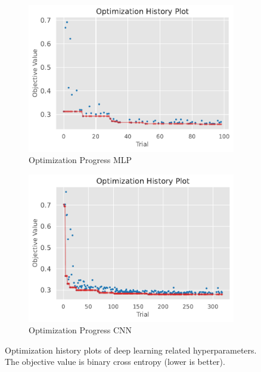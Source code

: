 \documentclass[runningheads]{llncs}
\begin{document}
\begin{figure}[h]
     \centering
     \begin{subfigure}[b]{0.49\textwidth}
         \centering
        \includegraphics[width=\textwidth]{images/hyper_tuning_lin.pdf}
        \caption{Optimization Progress MLP}

     \end{subfigure}
     \hfill
     \begin{subfigure}[b]{0.49\textwidth}
         \centering
    \includegraphics[width=\textwidth]{images/hyper_tuning_conv.pdf}
    \caption{Optimization Progress CNN}

    \end{subfigure}
    \caption{Optimization history plots of deep learning related hyperparameters. The objective value is binary cross entropy (lower is better).}

    \label{fig:hyperparam-optimization-fcn-cnn}
\end{figure}
\end{document}
